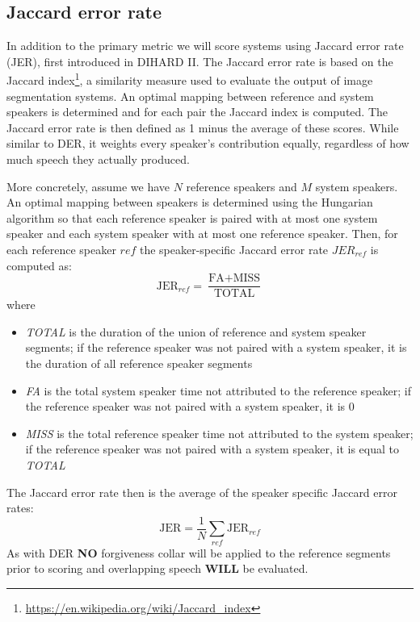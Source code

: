 \documentclass{article}
\begin{document}
\subsection{Jaccard error rate}
In addition to the primary metric we will score systems using Jaccard error rate (JER), first introduced in DIHARD II. The Jaccard error rate is based on the Jaccard index\footnote{\url{https://en.wikipedia.org/wiki/Jaccard_index}}, a similarity measure used to evaluate the output of image segmentation systems. An optimal mapping between reference and system speakers is determined and for each pair the Jaccard index is computed. The Jaccard error rate is then defined as 1 minus the average of these scores. While similar to DER, it weights every speaker's contribution equally, regardless of how much speech they actually produced.

More concretely, assume we have $N$ reference speakers and $M$ system speakers. An optimal mapping between speakers is determined using the Hungarian algorithm so that each reference speaker is paired with at most one system speaker and each system speaker with at most one reference speaker. Then, for each reference speaker $ref$ the speaker-specific Jaccard error rate $JER_{ref}$ is computed as:
    \begin{equation*}
        \textrm{JER}_{ref} = \frac{\textrm{FA} + \textrm{MISS}}{\textrm{TOTAL}}
    \end{equation*}
where
%
\begin{itemize}
    \item {\it TOTAL} is the duration of the union of reference and system speaker segments; if the reference speaker was not paired with a system speaker, it is the duration of all reference speaker segments
    \item {\it FA} is the total system speaker time not attributed to the reference speaker; if the reference speaker was not paired with a system speaker, it is 0
    \item {\it MISS} is the total reference speaker time not attributed to the system speaker; if the reference speaker was not paired with a system speaker, it is equal to {\it TOTAL}
\end{itemize}
%
The Jaccard error rate then is the average of the speaker specific Jaccard error rates:
    \begin{equation*}
        \textrm{JER} = \frac{1}{N}\sum_{ref}\textrm{JER}_{ref}
    \end{equation*}
%
As with DER {\bf NO} forgiveness collar will be applied to the reference segments prior to scoring and overlapping speech {\bf WILL} be evaluated.
\end{document}
